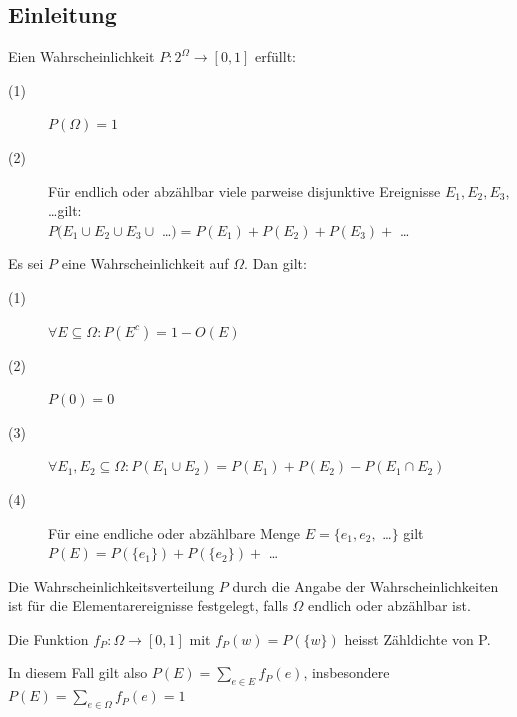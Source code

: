 \documentclass[10pt]{article}
\newtheorem[M]{definition}{Def.}
\newtheorem[M]{satz}{Satz}
\numberwithin{equation}{section}
\begin{document}
\subsection{Einleitung}
\begin{definition}[Wahrscheinlichkeit]
Eien Wahrscheinlichkeit $P: 2^{\Omega} \rightarrow [0,1]$ erfüllt:
\begin{description}
	\item[(1)] $P(\Omega) = 1$
	\item[(2)] Für endlich oder abzählbar viele parweise disjunktive Ereignisse $E_1,E_2,E_3, $\dots gilt: \\
	 $P(E_1 \cup E_2 \cup E_3 \cup$ \dots $) = P(E_1) + P(E_2) + P(E_3) + $ \dots 
\end{description}
\end{definition}
\begin{satz}
Es sei $P$ eine Wahrscheinlichkeit auf $\Omega$. Dan gilt:
\begin{description}
	\item[(1)] $\forall E \subseteq \Omega : P(E^c)=1-O(E)$
	\item[(2)] $P(0) = 0$
	\item[(3)] $\forall E_1, E_2 \subseteq \Omega : P(E_1\cup E_2) = P(E_1) + P(E_2) - P(E_1 \cap E_2)$
	\item[(4)] Für eine endliche oder abzählbare Menge $E=\{e_1,e_2,$ \dots $\}$ gilt $P(E) = P(\{e_1\}) + P(\{e_2\}) +$ \dots
\end{description}
\end{satz}
Die Wahrscheinlichkeitsverteilung $P$ durch die Angabe der Wahrscheinlichkeiten ist für die Elementarereignisse festgelegt, falls $\Omega$ endlich oder abzählbar ist.
\begin{definition}
Die Funktion $f_P : \Omega \rightarrow [0,1]$ mit $f_P(w)=P(\{w\})$ heisst Zähldichte von P.
 \end{definition}
 In diesem Fall gilt also $P(E)=\sum_{e \in E} f_P(e)$, insbesondere $P(E)=\sum_{e \in \Omega} f_P(e)=1$
 
\end{document}
